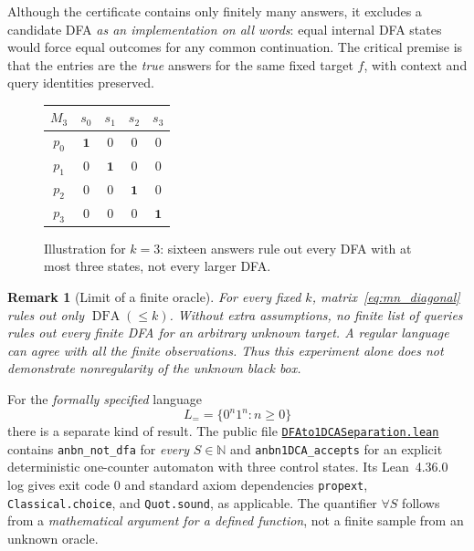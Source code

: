 \documentclass[11pt,a4paper]{article}
\newtheorem{remark}{Remark}[section]
\newcommand{\DFA}{\operatorname{DFA}}
\begin{document}
Although the certificate contains only finitely many answers, it excludes a candidate DFA \emph{as an implementation on all words}: equal internal DFA states would force equal outcomes for any common continuation. The critical premise is that the entries are the \emph{true} answers for the same fixed target $f$, with context and query identities preserved.

\begin{figure}[htbp]
\centering
\begin{tabular}{c|cccc}
$M_3$ & $s_0$ & $s_1$ & $s_2$ & $s_3$\\ \hline
$p_0$ & $\mathbf 1$ & 0 & 0 & 0\\
$p_1$ & 0 & $\mathbf 1$ & 0 & 0\\
$p_2$ & 0 & 0 & $\mathbf 1$ & 0\\
$p_3$ & 0 & 0 & 0 & $\mathbf 1$
\end{tabular}
\caption{Illustration for $k=3$: sixteen answers rule out every DFA with at most three states, not every larger DFA.}\label{fig:matrix}
\end{figure}

\begin{remark}[Limit of a finite oracle]\label{rem:oracle}
For every \emph{fixed} $k$, matrix~\eqref{eq:mn_diagonal} rules out only $\DFA(\le k)$. Without extra assumptions, \emph{no} finite list of queries rules out every finite DFA for an arbitrary unknown target. A regular language can agree with all the finite observations. Thus this experiment alone does not demonstrate nonregularity of the unknown black box.
\end{remark}

For the \emph{formally specified} language
\begin{equation}\label{eq:anbn}
L_{=}=\{0^n1^n:n\ge0\}
\end{equation}
there is a separate kind of result. The public file \href{https://github.com/Dnarts/proof-carrying-discovery/blob/main/formal/DFAto1DCASeparation.lean}{\texttt{DFAto1DCASeparation.lean}} contains \texttt{anbn\_not\_dfa} for \emph{every} $S\in\mathbb N$ and \texttt{anbn1DCA\_accepts} for an explicit deterministic one-counter automaton with three control states. Its Lean~4.36.0 log gives exit code $0$ and standard axiom dependencies \texttt{propext}, \texttt{Classical.choice}, and \texttt{Quot.sound}, as applicable. The quantifier $\forall S$ follows from a \emph{mathematical argument for a defined function}, not a finite sample from an unknown oracle.
\end{document}
